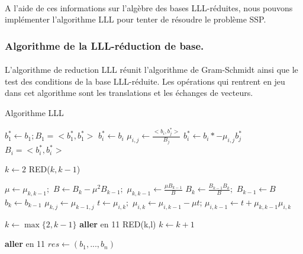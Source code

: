 \paragraph{}A l'aide de ces informations sur l'algèbre des bases LLL-réduites, nous pouvons implémenter l'algorithme LLL pour tenter de résoudre le problème SSP.

\newpage
\subsubsection{Algorithme de la LLL-réduction de base.}
\paragraph{} L'algorithme de reduction LLL réunit l'algorithme de Gram-Schmidt ainsi que le test des conditions de la base LLL-réduite. Les opérations qui rentrent en jeu dans cet algorithme sont les translations et les échanges de vecteurs. 
\begin{algorithm}
\caption{Algorithme LLL}

\begin{algorithmic}[1]
	\State $b_1^* \leftarrow b_1 ; B_1 = <b_1^*, b_1^*>$
		\State $b_i^* \leftarrow b_i$
			\State $\mu_{i,j} \leftarrow \frac{<b_i, b_j^*>}{B_j}$
			\State $b_i^* \leftarrow b_i* - \mu_{i,j} b_j^* $
		\EndFor 
		\State $B_i = <b_i ^*, b_i^*>$
	\EndFor
	
	\State $k \leftarrow 2$
	\State RED($k, k-1$)
	
		\State $\mu \leftarrow \mu_{k, k-1};$ $B \leftarrow B_k - \mu^2B_{k-1}; $ $\mu_{k, k-1} \leftarrow \frac{\mu B_{k-1}}{B}$
		\State $B_k \leftarrow \frac{B_{k-1}B_{k}}{B};$ $B_{k-1} \leftarrow B$
		\State $b_k \leftarrow b_{k-1}$ 
				\State $\mu_{k,j} \leftarrow \mu_{k-1, j}$
			\EndFor
		\EndIf
			\State $t \leftarrow \mu_{i,k};$ $\mu_{i,k} \leftarrow \mu_{i, k-1} - \mu t$; $\mu_{i, k-1} \leftarrow t + \mu_{k,k-1}\mu_{i,k}$
 		\EndFor
		
		\State $k \leftarrow \max\{2, k-1\}$
		\State \textbf{aller} en 11
	\Else 
			\State RED(k,l)
		\EndFor
		\State $k \leftarrow k +1$
	\EndIf
	
		\State \textbf{aller} en 11
	\Else 
		\State $res \leftarrow (b_1, ..., b_n)$
	\EndIf
\end{algorithmic}
\end{algorithm}



